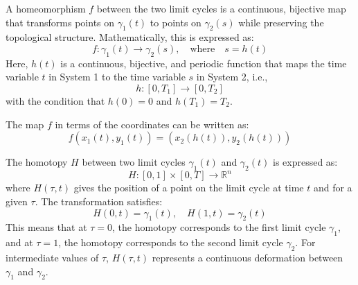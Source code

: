 \documentclass{article}
\theoremstyle{definition}
\theoremstyle{remark}
\begin{document}
A homeomorphism \( f \) between the two limit cycles is a continuous, bijective map that transforms points on \( \gamma_1(t) \) to points on \( \gamma_2(s) \) while preserving the topological structure. Mathematically, this is expressed as:
\[
f: \gamma_1(t) \rightarrow \gamma_2(s), \quad \text{where} \quad s = h(t)
\]
Here, \( h(t) \) is a continuous, bijective, and periodic function that maps the time variable \( t \) in System 1 to the time variable \( s \) in System 2, i.e.,
\[
h: [0, T_1] \rightarrow [0, T_2]
\]
with the condition that \( h(0) = 0 \) and \( h(T_1) = T_2 \).

The map \( f \) in terms of the coordinates can be written as:
\[
f(x_1(t), y_1(t)) = (x_2(h(t)), y_2(h(t)))
\]



The homotopy \( H \) between two limit cycles \( \gamma_1(t) \) and \( \gamma_2(t) \) is expressed as:
\[
H: [0,1] \times [0, T] \rightarrow \mathbb{R}^n
\]
where \( H(\tau, t) \) gives the position of a point on the limit cycle at time \( t \) and for a given \( \tau \). The transformation satisfies:
\[
H(0, t) = \gamma_1(t), \quad H(1, t) = \gamma_2(t)
\]
This means that at \( \tau = 0 \), the homotopy corresponds to the first limit cycle \( \gamma_1 \), and at \( \tau = 1 \), the homotopy corresponds to the second limit cycle \( \gamma_2 \). For intermediate values of \( \tau \), \( H(\tau, t) \) represents a continuous deformation between \( \gamma_1 \) and \( \gamma_2 \).
\end{document}
